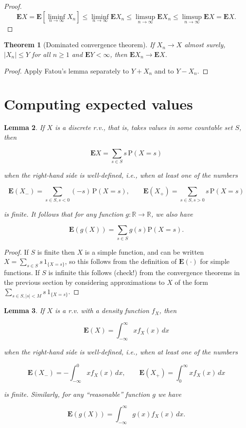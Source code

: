\documentclass[11pt]{report}
\newcommand{\R}{\mathbb{R}}
\theoremstyle{plain}
\newtheorem{thm}{Theorem}[chapter]
\newtheorem{lem}[thm]{Lemma}
\theoremstyle{definition}
\begin{document}
\begin{proof}

\[
\mathbf{E} X = \mathbf{E} [\liminf_{n\to\infty} X_n] \le \liminf_{n\to\infty} \mathbf{E} X_n \le \limsup_{n\to\infty} \mathbf{E} X_n \le \limsup_{n\to\infty}  \mathbf{E} X = \mathbf{E} X.
\]

\end{proof}

\begin{thm}[Dominated convergence theorem]
If $X_n\to X$ almost surely, $|X_n|\le Y$ for all
$n\ge 1$ and $\mathbf{E} Y<\infty$, then
$\mathbf{E} X_n\to \mathbf{E} X$.
\end{thm}

\begin{proof}
Apply Fatou's lemma separately to $Y+X_n$ and to
$Y-X_n$.
\end{proof}

\section{Computing expected values}

\begin{lem}
If $X$ is a discrete r.v., that is, takes values in
some countable set $S$, then

\[
\mathbf{E} X = \sum_{s\in S} s\, \mathrm{P}(X=s)
\]

when the right-hand side is well-defined, i.e., when
at least one of the numbers

\[
\mathbf{E}(X_-)=\sum_{s\in S, s<0} (-s)\,\mathrm{P}(X=s), \qquad \mathbf{E}(X_+)= \sum_{s\in S, s>0} s\, \mathrm{P}(X=s)
\]

is finite. It follows that for any function
$g:\R\to\R$, we also have

\[
\mathbf{E}(g(X)) = \sum_{s\in S} g(s) \mathrm{P}(X=s).
\]

\end{lem}

\begin{proof}
If $S$ is finite then $X$ is a simple function, and
can be written $X=\sum_{s\in S} s\,1_{\{X=s\}}$, so
this follows from the definition of
$\mathbf{E}(\cdot)$ for simple functions. If $S$ is
infinite this follows (check!) from the convergence
theorems in the previous section by considering
approximations to $X$ of the form
$\sum_{s\in S, |s|<M} s\, 1_{\{X=s\}}$.
\end{proof}

\begin{lem}
If $X$ is a r.v. with a density function $f_X$, then

\[
\mathbf{E}(X) = \int_{-\infty}^\infty x f_X(x)\,dx
\]

when the right-hand side is well-defined, i.e., when
at least one of the numbers

\[
\mathbf{E}(X_-) = -\int_{-\infty}^0 x f_X(x)\,dx, \qquad \mathbf{E}(X_+) = \int_0^\infty x f_X(x)\,dx
\]

is finite. Similarly, for any ``reasonable''
function $g$ we have

\[
\mathbf{E}(g(X)) = \int_{-\infty}^\infty g(x) f_X(x)\, dx.
\]

\end{lem}
\end{document}

